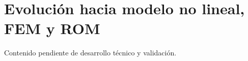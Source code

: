 \section{Evolución hacia modelo no lineal, FEM y ROM}

Contenido pendiente de desarrollo técnico y validación.
